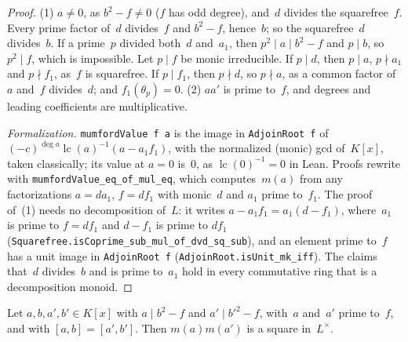 \begin{proof}
\leanok
(1) $a \ne 0$, as $b^2 - f \ne 0$ ($f$ has odd degree), and~$d$ divides the squarefree~$f$. Every
prime factor of~$d$ divides~$f$ and $b^2 - f$, hence~$b$; so the squarefree~$d$ divides~$b$. If a
prime~$p$ divided both~$d$ and~$a_1$, then $p^2 \mid a \mid b^2 - f$ and $p \mid b$, so
$p^2 \mid f$, which is impossible. Let $p \mid f$ be monic irreducible. If $p \mid d$, then
$p \mid a$, $p \nmid a_1$ and $p \nmid f_1$, as~$f$ is squarefree. If $p \mid f_1$, then
$p \nmid d$, so $p \nmid a$, as a common factor of~$a$ and~$f$ divides~$d$; and
$f_1(\theta_p) = 0$. (2) $aa'$ is prime to~$f$, and degrees and leading coefficients are
multiplicative.

\emph{Formalization.} \texttt{mumfordValue f a} is the image in \texttt{AdjoinRoot f} of
$(-c)^{\deg a}\operatorname{lc}(a)^{-1}(a - a_1 f_1)$, with the normalized (monic) gcd
of~$K[x]$, taken classically; its value at $a = 0$ is~$0$, as $\operatorname{lc}(0)^{-1} = 0$ in
Lean. Proofs rewrite with \texttt{mumfordValue\_eq\_of\_mul\_eq}, which computes~$m(a)$ from any
factorizations $a = d a_1$, $f = d f_1$ with monic~$d$ and $a_1$ prime to~$f_1$. The proof of~(1)
needs no decomposition of~$L$: it writes $a - a_1 f_1 = a_1(d - f_1)$, where~$a_1$ is prime to
$f = d f_1$ and $d - f_1$ is prime to $d f_1$
(\texttt{Squarefree.isCoprime\_sub\_mul\_of\_dvd\_sq\_sub}), and an element prime to~$f$ has a unit
image in \texttt{AdjoinRoot f} (\texttt{AdjoinRoot.isUnit\_mk\_iff}). The claims that~$d$
divides~$b$ and is prime to~$a_1$ hold in every commutative ring that is a decomposition monoid.
\end{proof}

\begin{lemma}
\label{lem:ds-coprime}
\leanok
{}
Let $a, b, a', b' \in K[x]$ with $a \mid b^2 - f$ and $a' \mid b'^2 - f$, with~$a$ and~$a'$ prime
to~$f$, and with $[a, b] = [a', b']$. Then $m(a)m(a')$ is a square in~$L^\times$.
\end{lemma}

